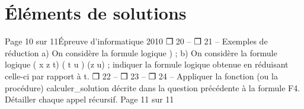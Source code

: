 
\newpage
\section{Éléments de solutions}
\shipoutAnswer


Page 10 sur 11Épreuve d’informatique 2010
❒ 20 – 
❒ 21 – Exemples de réduction
a) On considère la formule logique ) ; 
b) On considère la formule logique ( x \lor z \lor t) \land ( t \lor u ) \land (z \lor u) ; indiquer la
formule logique obtenue en réduisant celle-ci par rapport à t.
❒ 22 – 
❒ 23 –
❒ 24 – Appliquer la fonction (ou la procédure) calculer_solution décrite dans la
question précédente à la formule F4. Détailler chaque appel récursif.
Page 11 sur 11

\begin{Exercise}\it
\end{Exercise}
\begin{Answer}
\begin{lstlisting}
\end{lstlisting}
\end{Answer}
\medskip
